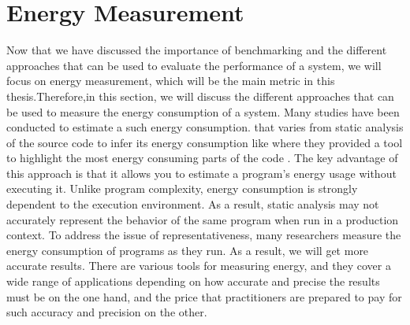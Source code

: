 

\section{Energy Measurement}\label{sec:soa_energymeasurement}
Now that we have discussed the importance of benchmarking and the different approaches that can be used to evaluate the performance of a system, we will focus on energy measurement, which will be the main metric in this thesis.Therefore,in this section, we will discuss the different approaches that can be used to measure the energy consumption of a system.
Many studies have been conducted to estimate a such energy consumption. that varies from static analysis of the source code to infer its energy consumption like \citeauthor{pereira_helping_2017} where they provided a tool to highlight the most energy consuming parts of the code \cite{pereira_helping_2017}.
The key advantage of this approach is that it allows you to estimate a program's energy usage without executing it.
Unlike program complexity, energy consumption is strongly dependent to the execution environment.
As a result, static analysis may not accurately represent the behavior of the same program when run in a production context.
To address the issue of representativeness, many researchers measure the energy consumption of programs as they run. As a result, we will get more accurate results.
There are various tools for measuring energy, and they cover a wide range of applications depending on how accurate and precise the results must be on the one hand, and the price that practitioners are prepared to pay for such accuracy and precision on the other.

